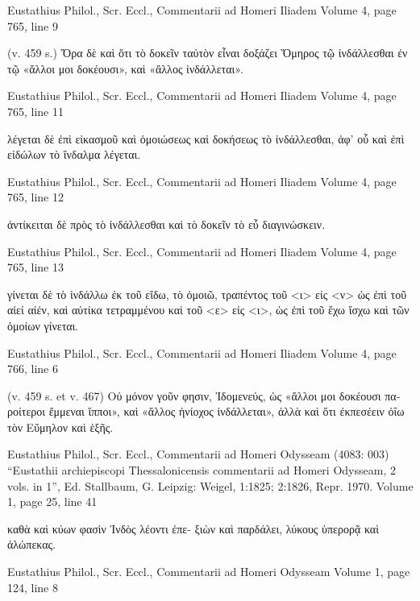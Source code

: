 \documentclass[12pt,letterpaper,twoside,final]{memoir}
\begin{document}
\begin{greek}
Eustathius Philol., Scr. Eccl., Commentarii ad Homeri Iliadem 
Volume 4, page 765, line 9

                                                  (v. 459 s.) Ὅρα δὲ καὶ ὅτι τὸ 
δοκεῖν ταὐτὸν εἶναι δοξάζει Ὅμηρος τῷ ἰνδάλλεσθαι ἐν τῷ «ἄλλοι μοι 
δοκέουσι», καὶ «ἄλλος ἰνδάλλεται». 



Eustathius Philol., Scr. Eccl., Commentarii ad Homeri Iliadem 
Volume 4, page 765, line 11

                                            λέγεται δὲ ἐπὶ εἰκασμοῦ καὶ ὁμοιώσεως καὶ 
δοκήσεως τὸ ἰνδάλλεσθαι, ἀφ' οὗ καὶ ἐπὶ εἰδώλων τὸ ἴνδαλμα λέγεται. 



Eustathius Philol., Scr. Eccl., Commentarii ad Homeri Iliadem 
Volume 4, page 765, line 12

                                  ἀντίκειται δὲ πρὸς τὸ ἰνδάλλεσθαι καὶ τὸ δοκεῖν τὸ 
εὖ διαγινώσκειν. 



Eustathius Philol., Scr. Eccl., Commentarii ad Homeri Iliadem 
Volume 4, page 765, line 13

                    γίνεται δὲ τὸ ἰνδάλλω ἐκ τοῦ εἴδω, τὸ ὁμοιῶ, τραπέντος τοῦ <ι> 
εἰς <ν> ὡς ἐπὶ τοῦ αἰεί αἰέν, καὶ αὐτίκα τετραμμένου καὶ τοῦ <ε> εἰς <ι>, ὡς ἐπὶ τοῦ ἔχω 
ἴσχω καὶ τῶν ὁμοίων γίνεται. 



Eustathius Philol., Scr. Eccl., Commentarii ad Homeri Iliadem 
Volume 4, page 766, line 6

                                (v. 459 s. et v. 467) Οὐ μόνον γοῦν φησιν, 
Ἰδομενεύς, ὡς «ἄλλοι μοι δοκέουσι παροίτεροι ἔμμεναι ἵπποι», καὶ «ἄλλος 
ἡνίοχος ἰνδάλλεται», ἀλλὰ καὶ ὅτι ἐκπεσέειν ὀΐω τὸν Εὔμηλον καὶ ἑξῆς. 



Eustathius Philol., Scr. Eccl., Commentarii ad Homeri Odysseam (4083: 003)
“Eustathii archiepiscopi Thessalonicensis commentarii ad Homeri Odysseam, 2 vols. in 1”, Ed. Stallbaum, G.
Leipzig: Weigel, 1:1825; 2:1826, Repr. 1970.
Volume 1, page 25, line 41

                                                                    καθὰ καὶ κύων φασὶν Ἰνδὸς λέοντι ἐπε-
ξιὼν καὶ παρδάλει, λύκους ὑπερορᾷ καὶ ἀλώπεκας. 



Eustathius Philol., Scr. Eccl., Commentarii ad Homeri Odysseam 
Volume 1, page 124, line 8


\end{greek}
\end{document}
